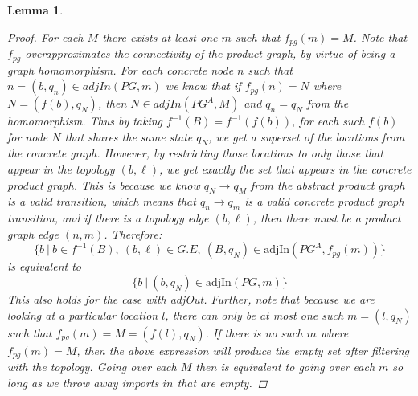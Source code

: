\documentclass[twocolumn, openany]{sig-alternate-10pt}
\newtheorem{lem}[thm]{Lemma}
\begin{document}
\begin{lem}
  \begin{proof}
    For each $M$ there exists at least one $m$ such that $f_{pg}(m) = M$. Note that $f_{pg}$ overapproximates the connectivity of the product graph, by virtue of being a graph homomorphism. For each concrete node $n$ such that $n = (b,q_n) \in adjIn(PG,m)$ we know that if $f_{pg}(n) = N$ where $N = (f(b),q_N)$, then $N \in adjIn(PG^A,M)$ and $q_n = q_N$ from the homomorphism. Thus by taking $f^{-1}(B) = f^{-1}(f(b))$, for each such $f(b)$ for node $N$ that shares the same state $q_N$, we get a superset of the locations from the concrete graph. However, by restricting those locations to only those that appear in the topology $(b,\ell)$, we get exactly the set that appears in the concrete product graph. 
    This is because we know $q_N \rightarrow q_M$ from the abstract product graph is a valid transition, which means that $q_n \rightarrow q_m$ is a valid concrete product graph transition, and if there is a topology edge $(b,\ell)$, then there must be a product graph edge $(n,m)$. Therefore:
    $$\{b ~\vert~ b \in f^{-1}(B),~ (b,\ell) \in G.E,~ (B,q_N) \in \text{adjIn}(PG^A,f_{pg}(m)) \}$$
    is equivalent to
    $$\{ b ~\vert~ (b,q_N) \in \text{adjIn}(PG,m)\}$$
    This also holds for the case with adjOut. Further, note that because we are looking at a particular location $l$, there can only be at most one such $m = (l,q_N)$ such that $f_{pg}(m) = M = (f(l), q_N)$. If there is no such $m$ where $f_{pg}(m) = M$, then the above expression will produce the empty set after filtering with the topology. Going over each $M$ then is equivalent to going over each $m$ so long as we throw away imports $\mathit{in}$ that are empty.

  \end{proof}


\end{lem}
\end{document}
